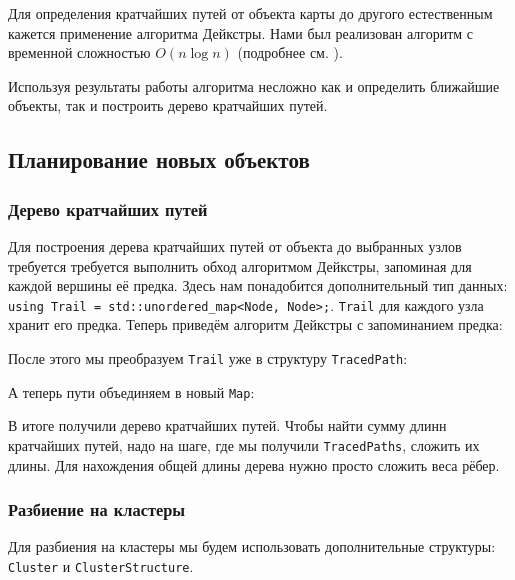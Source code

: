 \documentclass[11pt]{article}
\begin{document}
    Для определения кратчайших путей от объекта карты до другого естественным кажется применение алгоритма Дейкстры.
    Нами был реализован алгоритм с временной сложностью $ O(n \log n) $ (подробнее см. ).
    
    
    
    Используя результаты работы алгоритма несложно как и определить ближайшие объекты, так и построить дерево кратчайших путей.
    
	\subsection{Планирование новых объектов}
	
	\subsubsection{Дерево кратчайших путей}\label{subsubsection:shortest_paths_tree}
		
	Для построения дерева кратчайших путей от объекта до выбранных узлов требуется требуется выполнить обход алгоритмом Дейкстры, запоминая для каждой вершины её предка. Здесь нам понадобится дополнительный тип данных: \texttt{using Trail = std::unordered\_map<Node, Node>;}. \texttt{Trail} для каждого узла хранит его предка. Теперь приведём алгоритм Дейкстры с запоминанием предка:
	
	

	После этого мы преобразуем \texttt{Trail} уже в структуру \texttt{TracedPath}:

	

	А теперь пути объединяем в новый \texttt{Map}:

	

	В итоге получили дерево кратчайших путей. Чтобы найти сумму длинн кратчайших путей, надо на шаге, где мы получили \texttt{TracedPaths}, сложить их длины. Для нахождения общей длины дерева нужно просто сложить веса рёбер.

	\subsubsection{Разбиение на кластеры}

	Для разбиения на кластеры мы будем использовать дополнительные структуры: \texttt{Cluster} и \texttt{ClusterStructure}.
	
\end{document}
